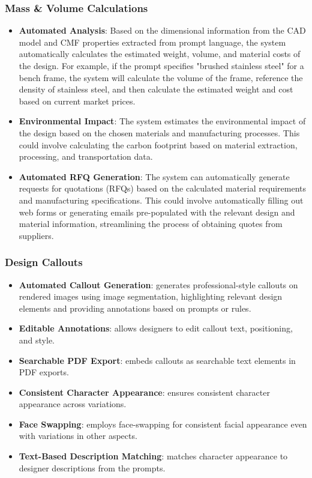 \documentclass[12pt]{article}
\begin{document}
\subsubsection{Mass \& Volume Calculations}
\begin{itemize}
\item \textbf{Automated Analysis}: Based on the dimensional information from the CAD model and CMF properties extracted from prompt language, the system automatically calculates the estimated weight, volume, and material costs of the design. For example, if the prompt specifies "brushed stainless steel" for a bench frame, the system will calculate the volume of the frame, reference the density of stainless steel, and then calculate the estimated weight and cost based on current market prices.
\item \textbf{Environmental Impact}: The system estimates the environmental impact of the design based on the chosen materials and manufacturing processes. This could involve calculating the carbon footprint based on material extraction, processing, and transportation data. 
\item \textbf{Automated RFQ Generation}: The system can automatically generate requests for quotations (RFQs) based on the calculated material requirements and manufacturing specifications. This could involve automatically filling out web forms or generating emails pre-populated with the relevant design and material information, streamlining the process of obtaining quotes from suppliers.
\end{itemize}

\subsubsection{Design Callouts}
\begin{itemize}
    \item \textbf{Automated Callout Generation}: generates professional-style callouts on rendered images using image segmentation, highlighting relevant design elements and providing annotations based on prompts or rules. 
    \item \textbf{Editable Annotations}: allows designers to edit callout text, positioning, and style.
    \item \textbf{Searchable PDF Export}: embeds callouts as searchable text elements in PDF exports.
    \item \textbf{Consistent Character Appearance}: ensures consistent character appearance across variations.
    \item \textbf{Face Swapping}: employs face-swapping for consistent facial appearance even with variations in other aspects.
    \item \textbf{Text-Based Description Matching}: matches character appearance to designer descriptions from the prompts.
\end{itemize}
\end{document}
